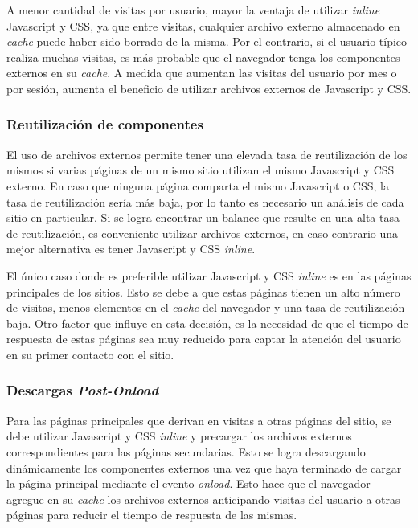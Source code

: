 A menor cantidad de visitas por usuario, mayor la ventaja de utilizar \emph{inline} Javascript y CSS, ya que entre visitas, cualquier archivo externo almacenado en \emph{cache}
puede haber sido borrado de la misma. Por el contrario, si el usuario típico realiza muchas visitas, es más probable que el navegador tenga los componentes externos en su
\emph{cache}. A medida que aumentan las visitas del usuario por mes o por sesión, aumenta el beneficio de utilizar archivos externos de Javascript y CSS.

\subsubsection{Reutilización de componentes}

El uso de archivos externos permite tener una elevada tasa de reutilización de los mismos si varias páginas de un mismo sitio utilizan el mismo Javascript y CSS externo.
En caso que ninguna página comparta el mismo Javascript o CSS, la tasa de reutilización sería más baja, por lo tanto es necesario un análisis de cada sitio en
particular. Si se logra encontrar un balance que resulte en una alta tasa de reutilización, es conveniente utilizar archivos externos, en caso contrario una mejor alternativa
es tener Javascript y CSS \emph{inline}.

El único caso donde es preferible utilizar Javascript y CSS \emph{inline} es en las páginas principales de los sitios. Esto se debe a que estas páginas
tienen un alto número de visitas, menos elementos en el \emph{cache} del navegador y una tasa de reutilización baja. Otro factor que influye en esta decisión, es la
necesidad de que el tiempo de respuesta de estas páginas sea muy reducido para captar la atención del usuario en su primer contacto con el sitio.

\subsubsection{Descargas \emph{Post-Onload}}

Para las páginas principales que derivan en visitas a otras páginas del sitio, se debe utilizar Javascript y CSS \emph{inline} y precargar los archivos externos correspondientes
para las páginas secundarias. Esto se logra descargando dinámicamente los componentes externos una vez que haya terminado de cargar la página principal mediante
el evento \emph{onload}. Esto hace que el navegador agregue en su \emph{cache} los archivos externos anticipando visitas del usuario a otras páginas para reducir el tiempo
de respuesta de las mismas.

